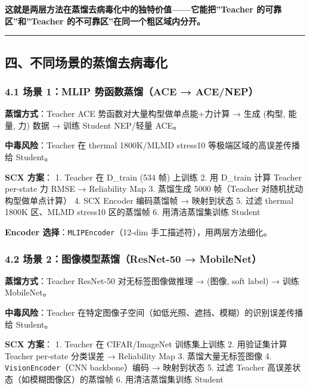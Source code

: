 \documentclass[
  12pt,
]{ctexart}
\begin{document}
\textbf{这就是两层方法在蒸馏去病毒化中的独特价值------它能把''Teacher
的可靠区''和''Teacher 的不可靠区''在同一个粗区域内分开。}

\begin{center}\rule{0.5\linewidth}{0.5pt}\end{center}

\subsection{四、不同场景的蒸馏去病毒化}\label{ux56dbux4e0dux540cux573aux666fux7684ux84b8ux998fux53bbux75c5ux6bd2ux5316}

\subsubsection{4.1 场景 1：MLIP 势函数蒸馏（ACE →
ACE/NEP）}\label{ux573aux666f-1mlip-ux52bfux51fdux6570ux84b8ux998face-acenep}

\textbf{蒸馏方式}：Teacher ACE 势函数对大量构型做单点能+力计算 → 生成
(构型, 能量, 力) 数据 → 训练 Student NEP/轻量 ACE。

\textbf{中毒风险}：Teacher 在 thermal 1800K/MLMD stress10
等极端区域的高误差传播给 Student。

\textbf{SCX 方案}： 1. Teacher 在 D\_train (534 帧) 上训练 2. 用
D\_train 计算 Teacher per-state 力 RMSE → Reliability Map 3. 蒸馏生成
5000 帧（Teacher 对随机扰动构型做单点计算） 4. SCX Encoder 编码蒸馏帧 →
映射到状态 5. 过滤 thermal 1800K 区、MLMD stress10 区的蒸馏帧 6.
用清洁蒸馏集训练 Student

\textbf{Encoder 选择}：\texttt{MLIPEncoder}（12-dim
手工描述符），用两层方法细化。

\subsubsection{4.2 场景 2：图像模型蒸馏（ResNet-50 →
MobileNet）}\label{ux573aux666f-2ux56feux50cfux6a21ux578bux84b8ux998fresnet-50-mobilenet}

\textbf{蒸馏方式}：Teacher ResNet-50 对无标签图像做推理 → (图像, soft
label) → 训练 MobileNet。

\textbf{中毒风险}：Teacher
在特定图像子空间（如低光照、遮挡、模糊）的识别误差传播给 Student。

\textbf{SCX 方案}： 1. Teacher 在 CIFAR/ImageNet 训练集上训练 2.
用验证集计算 Teacher per-state 分类误差 → Reliability Map 3.
蒸馏大量无标签图像 4. \texttt{VisionEncoder}（CNN backbone）编码 →
映射到状态 5. 过滤 Teacher 高误差状态（如模糊图像区）的蒸馏帧 6.
用清洁蒸馏集训练 Student
\end{document}
